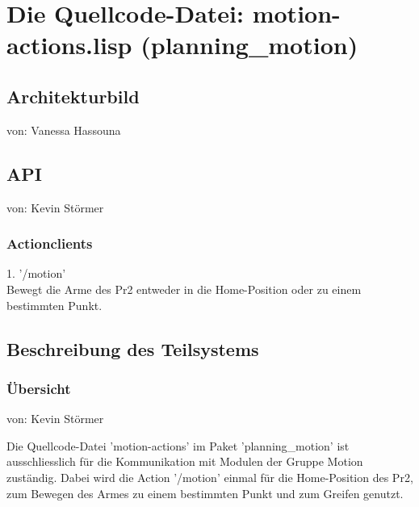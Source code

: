 \documentclass{suturo}
\makeatletter
\newcommand{\chapterauthor}[1]{%
  {\parindent0pt\vspace*{-27pt}%
  \linespread{0}\small\begin{flushright}von: #1\end{flushright}%
  \par\nobreak\vspace*{0pt}}
  \@afterheading%
}
\makeatother
\begin{document}

\section{Die Quellcode-Datei: motion-actions.lisp (planning\_motion)}
\subsection{Architekturbild}
\chapterauthor{Vanessa Hassouna}


\begin{figure}[!htb]
\end{figure}




\subsection{API}
\chapterauthor{Kevin Störmer}
\subsubsection{Actionclients}
1. '/motion' \\
Bewegt die Arme des Pr2 entweder in die Home-Position oder zu einem bestimmten Punkt.
\subsection{Beschreibung des Teilsystems}
\subsubsection{\"Ubersicht}
\chapterauthor{Kevin Störmer}
Die Quellcode-Datei 'motion-actions' im Paket 'planning\_motion'  ist ausschliesslich für die Kommunikation mit Modulen der Gruppe Motion zuständig. Dabei wird die Action '/motion' einmal für die Home-Position des Pr2, zum Bewegen des Armes zu einem bestimmten Punkt und zum Greifen genutzt.
\end{document}
